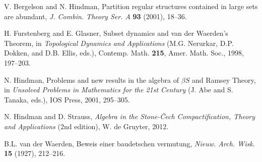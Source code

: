 \documentclass[10pt]{amsart}
\theoremstyle{definition}
\theoremstyle{remark}
\begin{document}
\begin{thebibliography}{}


V. Bergelson and N. Hindman,
Partition regular structures contained in large
sets are abundant, \emph{J. Combin. Theory Ser. A} \textbf{93} (2001), 18--36.

H. Furstenberg and E. Glasner, Subset dynamics and van der Waerden's Theorem,
in \emph{Topological Dynamics and Applications}
(M.G. Nerurkar, D.P. Dokken, and D.B. Ellis, eds.),  
Contemp. Math. \textbf{215}, Amer. Math. Soc., 1998, 197--203. 


N. Hindman, Problems and new results in the algebra of $\beta S$
and Ramsey Theory, in
\emph{Unsolved Problems in Mathematics for the 21st Century}
(J. Abe and S. Tanaka, eds.), IOS Press, 2001, 295--305. 


N. Hindman and D. Strauss, \emph{Algebra in the Stone-\v{C}ech
Compactification, Theory and Applications} (2nd edition),
W. de Gruyter, 2012.


B.L. van der Waerden, Beweis einer baudetschen vermutung, 
\emph{Nieuw. Arch. Wisk.} \textbf{15} (1927), 212--216.

\end{thebibliography}
\end{document}
